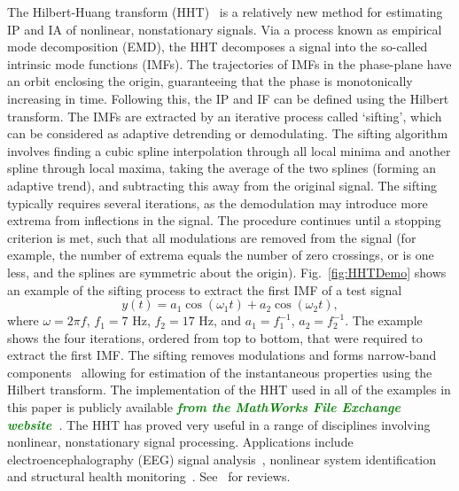 \documentclass[a4paper]{IEEEtran}
\newcommand{\dean}[1]{\textsf{\emph{\textbf{\textcolor{green}{#1}}}}}
\begin{document}
The Hilbert-Huang transform (HHT)~\cite{Huang1998} is a relatively new method for estimating IP and IA of nonlinear, nonstationary signals. Via a process known as empirical mode decomposition (EMD), the HHT decomposes a signal into the so-called intrinsic mode functions (IMFs). The trajectories of IMFs in the phase-plane have an orbit enclosing the origin, guaranteeing that the phase is monotonically increasing in time. Following this, the IP and IF can be defined using the Hilbert transform. The IMFs are extracted by an iterative process called `sifting', which can be considered as adaptive detrending or demodulating. The sifting algorithm involves finding a cubic spline interpolation through all local minima and another spline through local maxima, taking the average of the two splines (forming an adaptive trend), and subtracting this away from the original signal. The sifting typically requires several iterations, as the demodulation may introduce more extrema from inflections in the signal. The procedure continues until a stopping criterion is met, such that all modulations are removed from the signal (for example, the number of extrema equals the number of zero crossings, or is one less, and the splines are symmetric about the origin). Fig.~\ref{fig:HHTDemo} shows an example of the sifting process to extract the first IMF of a test signal
\begin{equation}\label{eq:FirstTestSig}
y\left( t \right) = a_1\cos \left(\omega_1t\right) + a_2\cos \left( \omega _2t \right),
\end{equation}
where $\omega = 2\pi f$, $f_1 = 7$ Hz, $f_2 = 17$ Hz, and $a_1 = f_1^{-1}$, $a_2=f_2^{-1}$. The example shows the four iterations, ordered from top to bottom, that were required to extract the first IMF. The sifting removes modulations and forms narrow-band components~\cite{Huang1998} allowing for estimation of the instantaneous properties using the Hilbert transform. The implementation of the HHT used in all of the examples in this paper is publicly available \dean{from the MathWorks File Exchange website~\cite{Tan2008}}. The HHT has proved very useful in a range of disciplines involving nonlinear, nonstationary signal processing. Applications include electroencephalography (EEG) signal analysis~\cite{Wang2008}, nonlinear system identification and structural health monitoring~\cite{Pai2008}. See~\cite{Huang2008,Huang2005a} for reviews.
\end{document}
